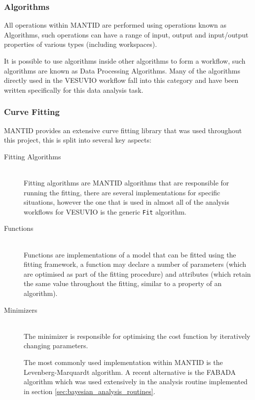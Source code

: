\documentclass[a4paper]{article}
\begin{document}
\subsubsection{Algorithms}

All operations within \gls*{MANTID} are performed using operations known as
Algorithms, such operations can have a range of input, output and input/output
properties of various types (including workspaces).

It is possible to use algorithms inside other algorithms to form a workflow,
such algorithms are known as Data Processing Algorithms. Many of the algorithms
directly used in the VESUVIO workflow fall into this category and have been
written specifically for this data analysis task.

\subsubsection{Curve Fitting}

\gls*{MANTID} provides an extensive curve fitting library that was used
throughout this project, this is split into several key aspects:

\begin{description}
  \item[Fitting Algorithms] \hfill \\
    Fitting algorithms are \gls*{MANTID} algorithms that are responsible for
    running the fitting, there are several implementations for specific
    situations, however the one that is used in almost all of the analysis
    workflows for VESUVIO is the generic \texttt{Fit} algorithm.

  \item[Functions] \hfill \\
    Functions are implementations of a model that can be fitted using the
    fitting framework, a function may declare a number of parameters (which are
    optimised as part of the fitting procedure) and attributes (which retain the
    same value throughout the fitting, similar to a property of an algorithm).

  \item[Minimizers] \hfill \\
    The minimizer is responsible for optimising the cost function by iteratively
    changing parameters.

    The most commonly used implementation within \gls*{MANTID} is the
    Levenberg-Marquardt \cite{Levenberg1944} algorithm. A recent alternative is
    the \gls*{FABADA} \cite{Pardo2011} algorithm which was used extensively in
    the analysis routine implemented in section
    \ref{sec:bayesian_analysis_routines}.
\end{description}
\end{document}
